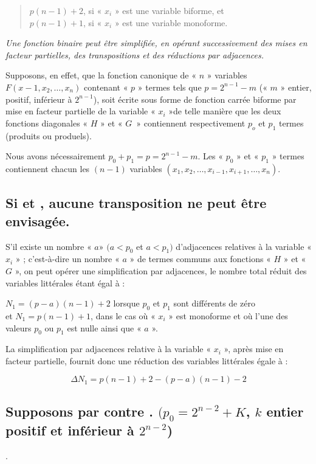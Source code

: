 \begin{quote}
$p(n-1) +2$, si « $x_i$ » est une variable biforme, et \\
$p(n-1) +1$, si « $x_i$ » est une variable monoforme.
\end{quote}

\textsl{Une fonction binaire peut être simplifiée, en opérant successivement des mises en facteur partielles, des transpositions et des réductions par adjacences.}

Supposons, en effet, que la fonction canonique de « $n$ » variables $F(x-1, x_2, \ldots, x_n)$ contenant « $p$ » termes tels que $p = 2^{n-1} - m$ (« $m$ » entier, positif, inférieur à $2^{n-1}$), soit écrite sous forme de fonction carrée biforme par   mise en facteur partielle de la variable « $x_i$ »de telle manière que les deux fonctions diagonales « $H$ » et « $G$~» contiennent respectivement  $p_o$ et $p_1$ termes (produits ou produels).

Nous avons nécessairement $ p_0 + p_1 = p = 2^{n-1} - m$. Les « $p_0$ » et « $p_1$ » termes contiennent chacun les $(n - 1)$ variables $(x_1, x_2, \ldots, x_{i-1}, x_{i+1}, \ldots, x_n)$.

\subsection{Si  et , aucune transposition ne peut être envisagée.}
S'il existe un nombre « $a$» $(a < p_0$ et  $a < p_1)$ d'adjacences relatives à la variable « $x_i$ » ; c'est-à-dire un nombre « $a$ » de termes communs aux fonctions « $H$ » et « $G$ », on peut opérer une simplification par adjacences, le nombre total réduit des variables littérales étant égal à :

$N_1 = (p-a) (n-1) +2$ lorsque $p_0$ et $p_1$ sont différents de zéro\\
et $N_1 = p(n-1) +1$, dans le cas où « $x_i$ » est monoforme et où l'une des valeurs $p_0$ ou $p_1$ est nulle ainsi que « $a$ ». 

La simplification par adjacences relative à la variable « $x_i$ », après mise en facteur partielle, fournit donc une réduction des variables littérales égale à :  

\[ \Delta N_1 = p (n-1) +2 - (p - a) (n-1) -2 \]

\centerline {   }


\subsection{Supposons par contre {}. \textmd{$(p_0 = 2^{n-2} +K$, $k$ entier positif et inférieur à $2^{n-2}$)}}. 

